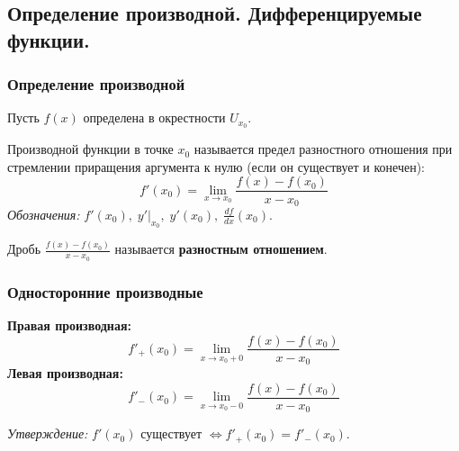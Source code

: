 \subsection{Определение производной. Дифференцируемые функции.}

\subsubsection*{Определение производной}

Пусть $f(x)$ определена в окрестности $U_{x_0}$.
\begin{tcolorbox}[title=Определение]
	Производной функции в точке $x_0$ называется предел разностного отношения при стремлении приращения аргумента к нулю (если он существует и конечен):
	\[ f'(x_0) = \lim_{x\to x_0} \frac{f(x) - f(x_0)}{x - x_0} \]
	\textit{Обозначения:} $f'(x_0),\; y'|_{x_0},\; y'(x_0),\; \frac{df}{dx}(x_0)$.
\end{tcolorbox}
Дробь $\frac{f(x) - f(x_0)}{x - x_0}$ называется \textbf{разностным отношением}.

\subsubsection*{Односторонние производные}
\begin{tcolorbox}[title=Определения]
	\textbf{Правая производная:}
	\[ f'_+(x_0) = \lim_{x\to x_0+0} \frac{f(x) - f(x_0)}{x - x_0} \]
	\textbf{Левая производная:}
	\[ f'_-(x_0) = \lim_{x\to x_0-0} \frac{f(x) - f(x_0)}{x - x_0} \]
\end{tcolorbox}
\textit{Утверждение:} $f'(x_0)$ существует $\Leftrightarrow f'_+(x_0) = f'_-(x_0)$.


